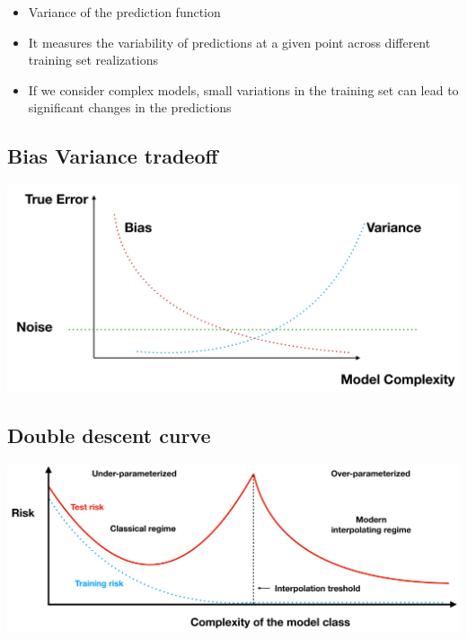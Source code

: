 \begin{itemize}
  \item Variance of the prediction function
  \item It measures the variability of predictions at a given point across different training set realizations
  \item If we consider complex models, small variations in the training set can lead to significant changes in the predictions
\end{itemize}

\subsection*{Bias Variance tradeoff}

\includegraphics*[width=0.7\columnwidth]{figures/bias_variance.jpg}

\subsection*{Double descent curve}

\includegraphics*[width=0.7\columnwidth]{figures/double_descent_curve.jpg}
